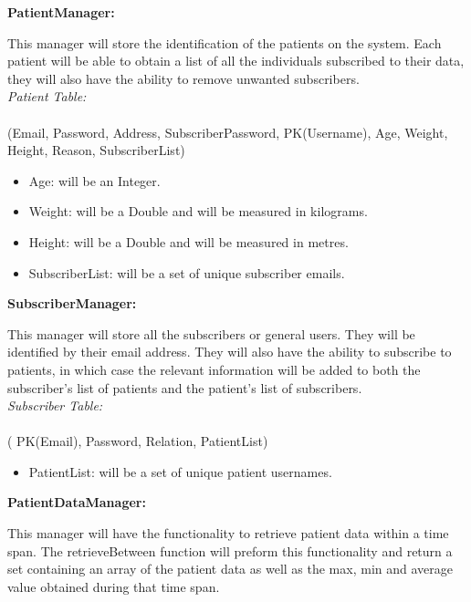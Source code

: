 \textbf{PatientManager:}

	This manager will store the identification of the patients on the system. Each patient will be able to obtain a list of all the individuals subscribed to their data, they will also have the ability to remove unwanted subscribers.\\

	\emph{Patient Table:}\\\\
		(Email, Password, Address, SubscriberPassword, PK(Username), Age, Weight, Height, Reason, SubscriberList)\\

\begin{itemize}
	\item Age: will be an Integer.\\
	\item Weight: will be a Double and will be measured in kilograms.\\
	\item Height: will be a Double and will be measured in metres.\\
	\item SubscriberList: will be a set of unique subscriber emails.	\\
\end{itemize}

	
	
\textbf{SubscriberManager:}

This manager will store all the subscribers or general users. They will be identified by their email address. They will also have the ability to subscribe to patients, in which case the relevant information will be added to both the subscriber's list of patients and the patient's list of subscribers.\\

	\emph{Subscriber Table:}\\\\
		( PK(Email), Password, Relation, PatientList)\\
\begin{itemize}
		\item PatientList: will be a set of unique patient usernames.	\\
\end{itemize}
\textbf{PatientDataManager:}

This manager will have the functionality to retrieve patient data within a time span. The retrieveBetween function will preform this functionality and return a set containing an array of the patient data as well as the max, min and average value obtained during that time span.\\

